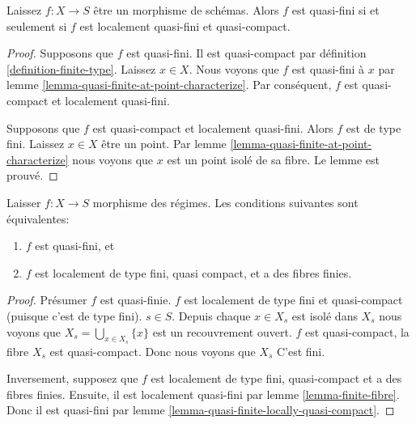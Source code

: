 \begin{lemma}

\label{lemma-quasi-finite-locally-quasi-compact}
Laissez $f : X \to S$ être un morphisme de schémas. Alors $f$ est quasi-fini si et seulement si $f$ est localement quasi-fini et quasi-compact.
\end{lemma}

\begin{proof}
Supposons que $f$ est quasi-fini. Il est quasi-compact par définition \ref{definition-finite-type}. Laissez $x \in X$. Nous voyons que $f$ est quasi-fini à $x$ par lemme \ref{lemma-quasi-finite-at-point-characterize}. Par conséquent, $f$ est quasi-compact et localement quasi-fini.

\medskip\noindent
Supposons que $f$ est quasi-compact et localement quasi-fini. Alors $f$ est de type fini. Laissez $x \in X$ être un point. Par lemme \ref{lemma-quasi-finite-at-point-characterize} nous voyons que $x$ est un point isolé de sa fibre. Le lemme est prouvé.
\end{proof}

\begin{lemma}

\label{lemma-quasi-finite}

Laisser $f : X \to S$ morphisme des régimes. Les conditions suivantes sont équivalentes:

\begin{enumerate}

\item  $f$ est quasi-fini, et
\item  $f$ est localement de type fini, quasi compact, et a des fibres finies.

\end{enumerate}

\end{lemma}

\begin{proof}

Présumer $f$ est quasi-finie. $f$ est localement de type fini et quasi-compact (puisque c'est de type fini). $s \in S$. Depuis chaque $x \in X_s$ est isolé dans $X_s$ nous voyons que
$X_s = \bigcup_{x \in X_s} \{x\}$ est un recouvrement ouvert. $f$
est quasi-compact, la fibre $X_s$ est quasi-compact. Donc nous voyons que $X_s$ C'est fini.

\medskip\noindent
Inversement, supposez que $f$ est localement de type fini, quasi-compact et a des fibres finies. Ensuite, il est localement quasi-fini par lemme \ref{lemma-finite-fibre}. Donc il est quasi-fini par lemme \ref{lemma-quasi-finite-locally-quasi-compact}.
\end{proof}

